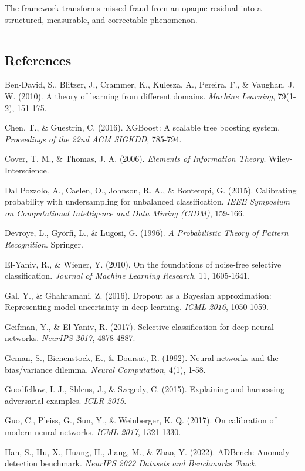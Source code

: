 \documentclass[
  11pt,
]{article}
\begin{document}
The framework transforms missed fraud from an opaque residual into a
structured, measurable, and correctable phenomenon.

\begin{center}\rule{0.5\linewidth}{0.5pt}\end{center}

\subsection{References}\label{references}

Ben-David, S., Blitzer, J., Crammer, K., Kulesza, A., Pereira, F., \&
Vaughan, J. W. (2010). A theory of learning from different domains.
\emph{Machine Learning}, 79(1-2), 151-175.

Chen, T., \& Guestrin, C. (2016). XGBoost: A scalable tree boosting
system. \emph{Proceedings of the 22nd ACM SIGKDD}, 785-794.

Cover, T. M., \& Thomas, J. A. (2006). \emph{Elements of Information
Theory}. Wiley-Interscience.

Dal Pozzolo, A., Caelen, O., Johnson, R. A., \& Bontempi, G. (2015).
Calibrating probability with undersampling for unbalanced
classification. \emph{IEEE Symposium on Computational Intelligence and
Data Mining (CIDM)}, 159-166.

Devroye, L., Györfi, L., \& Lugosi, G. (1996). \emph{A Probabilistic
Theory of Pattern Recognition}. Springer.

El-Yaniv, R., \& Wiener, Y. (2010). On the foundations of noise-free
selective classification. \emph{Journal of Machine Learning Research},
11, 1605-1641.

Gal, Y., \& Ghahramani, Z. (2016). Dropout as a Bayesian approximation:
Representing model uncertainty in deep learning. \emph{ICML 2016},
1050-1059.

Geifman, Y., \& El-Yaniv, R. (2017). Selective classification for deep
neural networks. \emph{NeurIPS 2017}, 4878-4887.

Geman, S., Bienenstock, E., \& Doursat, R. (1992). Neural networks and
the bias/variance dilemma. \emph{Neural Computation}, 4(1), 1-58.

Goodfellow, I. J., Shlens, J., \& Szegedy, C. (2015). Explaining and
harnessing adversarial examples. \emph{ICLR 2015}.

Guo, C., Pleiss, G., Sun, Y., \& Weinberger, K. Q. (2017). On
calibration of modern neural networks. \emph{ICML 2017}, 1321-1330.

Han, S., Hu, X., Huang, H., Jiang, M., \& Zhao, Y. (2022). ADBench:
Anomaly detection benchmark. \emph{NeurIPS 2022 Datasets and Benchmarks
Track}.
\end{document}

